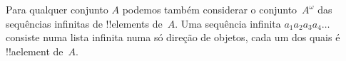 \documentclass[../../../include/open-logic-section]{subfiles}
\begin{document}
\begin{ex}
Para qualquer conjunto $A$ podemos também considerar o conjunto~$A^\omega$ das sequências infinitas
de !!{element}s de~$A$. Uma sequência infinita
$a_1a_2a_3a_4\dots$ consiste numa lista infinita numa só direção de objetos,
cada um dos quais é !!a{element} de~$A$.
\end{ex}
\end{document}
